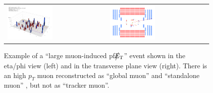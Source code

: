 %
\begin{figure}[h]
 \centering
 \begin{tabular}{ll}
   \includegraphics[width=0.47\textwidth]{fig/largeMuonInducedPfMET.png} &
   \includegraphics[width=0.47\textwidth]{fig/largeMuonInducedPfMET_1.png} \\
 \end{tabular}
\caption{Example of a ``large muon-induced pf$\big\slash\hspace{-1.6ex}{E_\text{T}}$'' event
shown in the eta/phi view (left) and in the transverse plane view (right). There is an high $p_{T}$ 
muon reconstructed as ``global muon'' and ``standalone muon'' , but not as ``tracker muon''.}
\label{fig:largeMuonInducedPfMET}
\end{figure}




